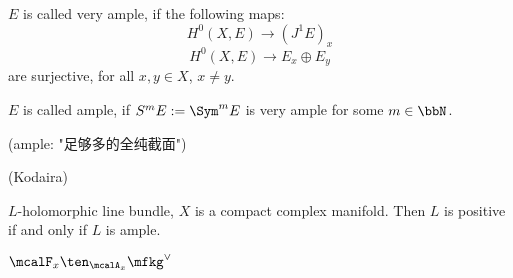 \begin{definition}
$E$ is called very ample, if the following maps:
$$H^0(X,E)\to (J^1E)_x$$
$$H^0(X,E)\to E_x\oplus E_y$$
are surjective, for all $x,y\in X$, $x\neq y$. 

$E$ is called ample, if $S^mE:=\Sym^m E$ is very ample for some $m\in\bbN$.
\end{definition}

(ample: "足够多的全纯截面")

\begin{thm}(Kodaira)

$L$-holomorphic line bundle, $X$ is a compact complex manifold.
Then $L$ is positive if and only if $L$ is ample.
\end{thm}

$\mcalF_x\ten_{\mcalA_x}\mfkg^\vee$






